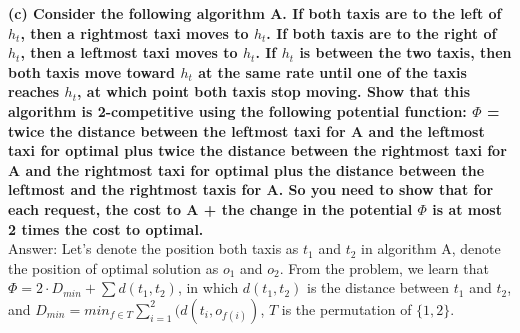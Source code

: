\documentclass{article}
\begin{document}
\textbf{(c) Consider the following algorithm A. If both taxis are to the left of $h_t$, then a rightmost taxi moves to $h_t$. If both taxis are to the right of $h_t$, then a leftmost taxi moves to $h_t$. If $h_t$ is between the two taxis, then both taxis move toward $h_t$ at the same rate until one of the taxis reaches $h_t$, at which point both taxis stop moving. Show that this algorithm is 2-competitive using the following potential function: $\Phi$ = twice the distance between the leftmost taxi for A and the leftmost taxi for optimal plus twice the distance between the rightmost taxi for A and the rightmost taxi for optimal plus the distance between the leftmost and the rightmost taxis for A. So you need to show that for each request, the cost to A + the change in the potential $\Phi$ is at most 2 times the cost to optimal.
}\\ \newline
Answer: Let's denote the position both taxis as $t_1$ and $t_2$ in algorithm A, denote the position of optimal solution as $o_1$ and $o_2$. From the problem, we learn that $\Phi = 2\cdot D_{min} + \sum d(t_1, t_2)$, in which $d(t_1, t_2)$ is the distance between $t_1$ and $t_2$, and $D_{min} = min_{f\in T}\sum_{i=1}^2(d(t_i, o_{f(i)})$, $T$ is the permutation of $\{1,2\}$.
\end{document}
